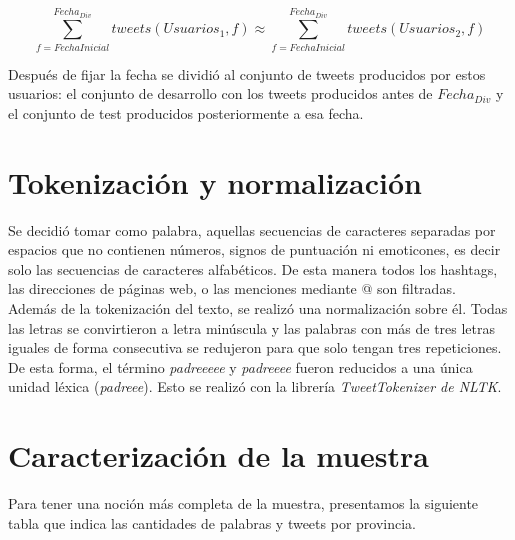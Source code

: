 \begin{equation}
\sum_{ f = FechaInicial}^{Fecha_{Div}} tweets(Usuarios_1,f) \approx \sum_{ f = FechaInicial}^{Fecha_{Div}} tweets(Usuarios_2,f) 
\end{equation}

Después de fijar la fecha se dividió al conjunto de tweets producidos por estos usuarios: el conjunto de desarrollo con los tweets producidos antes de $Fecha_{Div}$ y el conjunto de test producidos posteriormente a esa fecha.

\section{Tokenización y normalización}

Se decidió tomar como palabra, aquellas secuencias de caracteres separadas por espacios que no contienen números, 
signos de puntuación ni emoticones, es decir solo las secuencias de caracteres alfabéticos. De esta manera todos los hashtags, las direcciones de páginas web, o las menciones mediante @ son filtradas.\\
Además de la tokenización del texto, se realizó una normalización sobre él. Todas las letras se convirtieron a letra minúscula y las palabras con más de tres letras iguales de forma consecutiva se redujeron para que solo tengan tres repeticiones. De esta forma, el término \textit{padreeeee} y \textit{padreeee} fueron reducidos a una única unidad léxica (\textit{padreee}). Esto se realizó con la librería \textit{TweetTokenizer de NLTK}. 

\section{Caracterización de la muestra}

Para tener una noción más completa de la muestra, presentamos la siguiente tabla que indica las cantidades de palabras y tweets por provincia.



